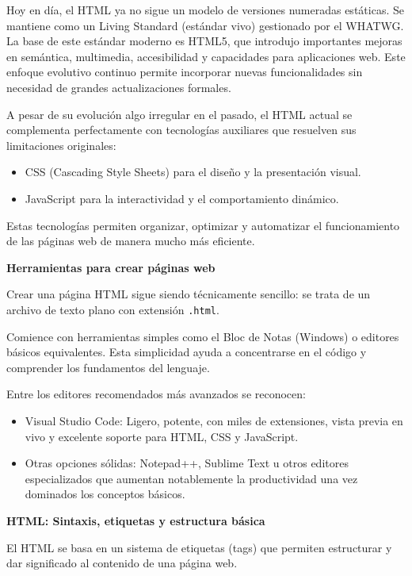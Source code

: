 \documentclass[11.5pt]{article}
\begin{document}
	Hoy en día, el HTML ya no sigue un modelo de versiones numeradas estáticas. Se mantiene como un Living Standard (estándar vivo) gestionado por el WHATWG. La base de este estándar moderno es HTML5, que introdujo importantes mejoras en semántica, multimedia, accesibilidad y capacidades para aplicaciones web. Este enfoque evolutivo continuo permite incorporar nuevas funcionalidades sin necesidad de grandes actualizaciones formales.
	
	A pesar de su evolución algo irregular en el pasado, el HTML actual se complementa perfectamente con tecnologías auxiliares que resuelven sus limitaciones originales:
	
	\begin{itemize}
		\item CSS (Cascading Style Sheets) para el diseño y la presentación visual.
		\item 	JavaScript para la interactividad y el comportamiento dinámico.
	\end{itemize}
	
	Estas tecnologías permiten organizar, optimizar y automatizar el funcionamiento de las páginas web de manera mucho más eficiente.
	
	\noindent\textbf{{\large Herramientas para crear páginas web}}
	
	Crear una página HTML sigue siendo técnicamente sencillo: se trata de un archivo de texto plano con extensión \verb|.html|.

	Comience con herramientas simples como el Bloc de Notas (Windows) o editores básicos equivalentes. Esta simplicidad ayuda a concentrarse en el código y comprender los fundamentos del lenguaje.
	
	Entre los editores recomendados más avanzados se reconocen:
	
	\begin{itemize}
		\item Visual Studio Code: Ligero, potente, con miles de extensiones, vista previa en vivo y excelente soporte para HTML, CSS y JavaScript.
		\item 	Otras opciones sólidas: Notepad++, Sublime Text u otros editores especializados que aumentan notablemente la productividad una vez dominados los conceptos básicos.
	\end{itemize}
	
	\noindent\textbf{{\large HTML: Sintaxis, etiquetas y estructura básica}}
	
	El HTML se basa en un sistema de etiquetas (tags) que permiten estructurar y dar significado al contenido de una página web.
	
\end{document}
